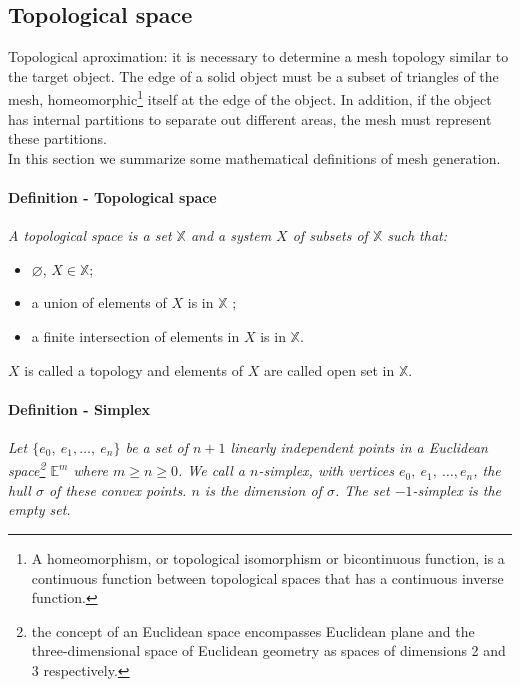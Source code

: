 
\subsection{Topological space}

Topological aproximation: it is necessary to determine a mesh topology similar to the target object. The edge of a solid object must be a subset of triangles of the mesh, homeomorphic\footnote{A homeomorphism, or topological isomorphism or bicontinuous function, is a continuous function between topological spaces that has a continuous inverse function.} itself at the edge of the object. In addition, if the object has internal partitions to separate out different areas, the mesh must represent these partitions.\\

In this section we summarize some mathematical definitions of mesh generation.

\paragraph{Definition - Topological space}
{
\it A topological space is a set $\mathbb{X}$ and a system $X$ of subsets of $\mathbb{X}$ such that:
\begin{itemize}
\item  $\varnothing$, $X \in \mathbb{X}$;
\item  a union of elements of $X$ is in $\mathbb{X}$ ;
\item  a finite intersection of elements in $X$ is in $\mathbb{X}$.
\end{itemize}

$X$ is called a topology and elements of $X$ are called open set in $\mathbb{X}$. %
}

\paragraph{Definition - Simplex}
{
\it Let $\{e_{0},~e_{1}, \dots,~ e_{n} \}$ be a set of $n+1$ linearly independent points in a Euclidean space\footnote{the concept of an Euclidean space encompasses Euclidean plane and the three-dimensional space of Euclidean geometry as spaces of dimensions 2 and 3 respectively.} $\mathbb{E}^{m}$ where $m \ge n \ge 0$. We call a $n$-simplex, with vertices $e_{0},~e_ {1},~\dots, e_{n}$, the hull $\sigma $ of these convex points. $n$ is the dimension of $\sigma$. The set $-1$-simplex is the empty set.
}

